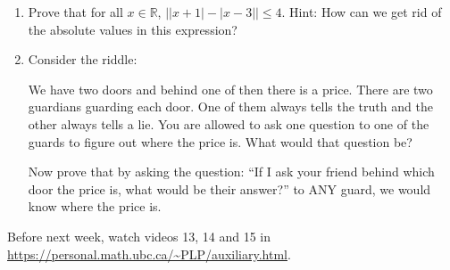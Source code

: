\documentclass[12pt]{article}
\begin{document}
\begin{enumerate}
\item Prove that for all $x\in\mathbb R$, $\left| |x+1|-|x-3| \right|\leq 4$.
Hint: How can we get rid of the absolute values in this expression?

\item Consider the riddle:
\begin{center}
We have two doors and behind one of then there is a price. There are two guardians guarding each door. One of them always tells the truth and the other always tells a lie. You are allowed to ask one question to one of the guards to figure out where the price is. What would that question be?
\end{center}

Now prove that by asking the question: ``If I ask your friend behind which door the price is, what would be their answer?'' to ANY guard, we would know where the price is.

\end{enumerate}

Before next week, watch videos 13, 14 and 15 in \url{https://personal.math.ubc.ca/~PLP/auxiliary.html}.
\end{document}
